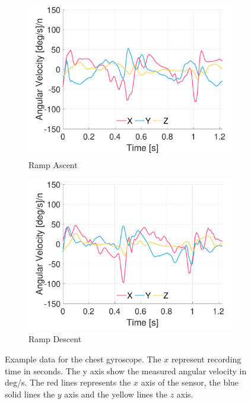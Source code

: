 \begin{figure}[p]
    \begin{subfigure}[b]{0.49\textwidth}
         \centering
         \includegraphics[width=\textwidth]{content/3-Methods/example-data/ch3_example_data_subject_01_chest_gyro_activity_ramp_up.pdf}
         \caption{Ramp Ascent}
    \end{subfigure}
    \begin{subfigure}[b]{0.49\textwidth}
         \centering
         \includegraphics[width=\textwidth]{content/3-Methods/example-data/ch3_example_data_subject_01_chest_gyro_activity_ramp_down.pdf}
         \caption{Ramp Descent}
    \end{subfigure}
    \caption[Example chest gyroscope data]{Example data for the chest gyroscope. The $x$ represent recording time in seconds. The y axis show the measured angular velocity in deg/s. The red lines represents the $x$ axis of the sensor, the blue solid lines the $y$ axis and the yellow lines the $z$ axis.}
    \label{fig:example-chest-gyro-sensor-data}
\end{figure}
